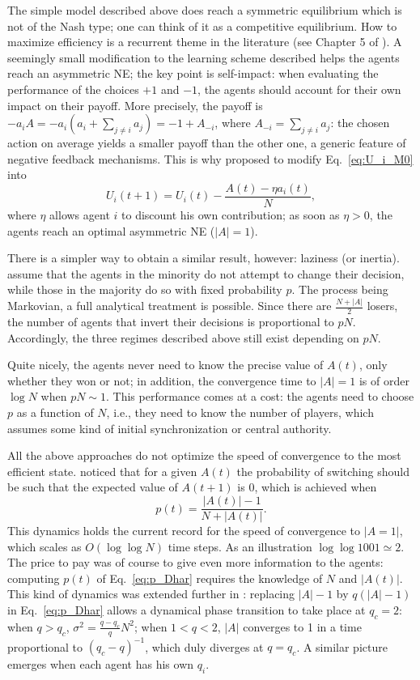 \documentclass[aps,twocolumn,nofootinbib,sortedaddress,reprint]{revtex4-1}
\begin{document}
The simple model described above does reach a symmetric equilibrium
which is not of the Nash type; one can think of it as a competitive
equilibrium. How to maximize efficiency is a recurrent theme in the
literature (see Chapter 5 of \textcite{MGbook}). A seemingly small
modification to the learning scheme described helps the agents reach
an asymmetric NE; the key point is self-impact: when evaluating the
performance of the choices $+1$ and $-1$, the agents should account for
their own impact on their payoff. More precisely, the payoff is
$-a_iA=-a_i(a_i+\sum_{j\ne i}a_j)=-1+A_{-i}$, where $A_{-i}=\sum_{j\ne
  i}a_j$: the chosen action on average yields a smaller payoff than
the other one, a generic feature of negative feedback
mechanisms. This is why \textcite{MC00} proposed to modify Eq.\ \eqref{eq:U_i_M0} into
$$ U_{i}(t+1)=U_{i}(t)-\frac{A(t)-\eta a_i(t)}{N},
$$ where $\eta$ allows agent $i$ to discount his own contribution; as
soon as $\eta>0$, the agents reach an optimal asymmetric NE ($|A|=1$).

There is a simpler way to obtain a similar result, however: laziness
(or inertia).  \textcite{Reents} assume that the agents in the
minority do not attempt to change their decision, while those in the majority do
so with fixed probability $p$. The process being Markovian, a full
analytical treatment is possible. Since there are $\frac{N+|A|}{2}$
losers, the number of agents that invert their decisions is proportional to
$pN$. Accordingly, the three regimes described above still exist
depending on $pN$.

Quite nicely, the agents never need to know the precise value of
$A(t)$, only whether they won or not; in addition, the convergence time to
$|A|=1$ is of order $\log N$ when $pN\sim 1$. This performance comes
at a cost: the agents need to choose $p$ as a function of $N$, i.e.,
they need to know the number of players, which assumes some kind of
initial synchronization or central authority.


All the above approaches do not optimize the speed of convergence to
the most efficient state. \textcite{Dhar2011} noticed that for a given
$A(t)$ the probability of switching should be such that the expected
value of $A(t+1)$ is 0, which is achieved when
\begin{equation}
\label{eq:p_Dhar}
p(t)=\frac{|A(t)|-1}{N+|A(t)|}.
\end{equation}
This dynamics holds the current record for the speed of convergence to
$|A=1|$, which scales as $O(\log\log N)$ time steps. As an illustration $\log \log 1001 \simeq 2$.
 The price to pay was of course to give even more information
to the agents: computing $p(t)$ of Eq.\ \eqref{eq:p_Dhar} requires the
knowledge of $N$ and $|A(t)|$.  This kind of dynamics was
extended further in \textcite{Biswas2012}: replacing $|A|-1$ by
$q(|A|-1)$ in Eq.\ \eqref{eq:p_Dhar} allows a dynamical phase
transition to take place at $q_c=2$: when $q>q_c$,
$\sigma^2=\frac{q-q_c}{q}N^ 2$; when $1<q<2$, $|A|$ converges to 1 in
a time proportional to $(q_c-q)^{-1}$, which duly diverges at
$q=q_c$. A similar picture emerges when each agent has his own $q_i$.
\end{document}
